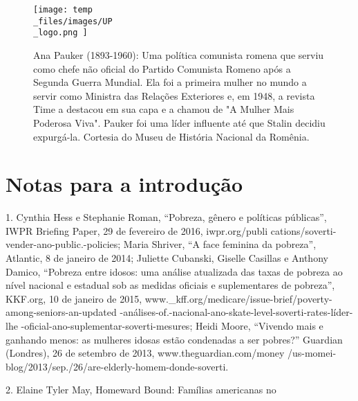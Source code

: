 \begin{figure}
	\centering
	\texttt{[image: temp\\\_files/images/UP\\\_logo.png ]}
	\caption{Ana Pauker (1893-1960): Uma política comunista romena que serviu como chefe não oficial do Partido Comunista Romeno após a Segunda Guerra Mundial. Ela foi a primeira mulher no mundo a servir como Ministra das Relações Exteriores e, em 1948, a revista Time a destacou em sua capa e a chamou de "A Mulher Mais Poderosa Viva". Pauker foi uma líder influente até que Stalin decidiu expurgá-la. Cortesia do Museu de História Nacional da Romênia.}
	\label{ }
\end{figure}
 \par 
\chapter{Notas para a introdução}\label{Notas para a introdução}
 \par 
1. Cynthia Hess e Stephanie Roman, “Pobreza, gênero e políticas públicas”, IWPR Briefing Paper, {\color{blue}29} de fevereiro de 2016, iwpr.org/publi cations/soverti-vender-ano-public.-policies; Maria Shriver, “A face feminina da pobreza”, Atlantic, {\color{blue}8} de janeiro de 2014; Juliette Cubanski, Giselle Casillas e Anthony Damico, “Pobreza entre idosos: uma análise atualizada das taxas de pobreza ao nível nacional e estadual sob as medidas oficiais e suplementares de pobreza”, KKF.org, {\color{blue}10} de janeiro de 2015, www._kff.org/medicare/issue-brief/poverty-among-seniors-an-updated -análises-of.-nacional-ano-skate-level-soverti-rates-líder-lhe -oficial-ano-suplementar-soverti-mesures; Heidi Moore, “Vivendo mais e ganhando menos: as mulheres idosas estão condenadas a ser pobres?” Guardian (Londres), {\color{blue}26} de setembro de 2013, www.theguardian.com/money /us-momei-blog/2013/sep./26/are-elderly-homem-donde-soverti.
 \par 
2. Elaine Tyler May, Homeward Bound: Famílias americanas no
 \par 
